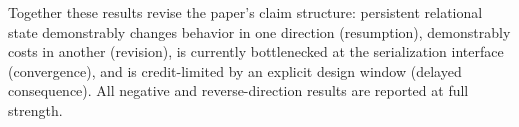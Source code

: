 Together these results revise the paper's claim structure: persistent
relational state demonstrably changes behavior in one direction
(resumption), demonstrably costs in another (revision), is currently
bottlenecked at the serialization interface (convergence), and is
credit-limited by an explicit design window (delayed consequence).
All negative and reverse-direction results are reported at full
strength.
